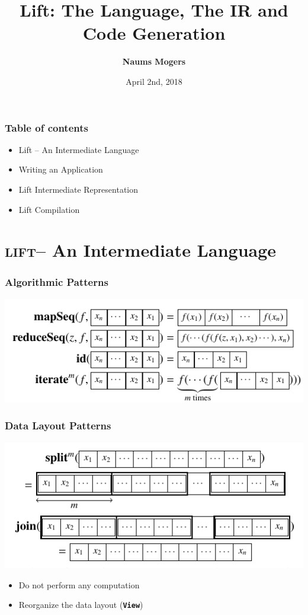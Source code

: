 \documentclass[10pt]{beamer}
\title{Lift: The Language, The IR and Code Generation}
\date{April 2nd, 2018}
\author{\textbf{Naums Mogers}}
\institute{University of Edinburgh}
\newcommand{\lift}{\textsc{lift}\space}
\newcommand{\code}[1]{\textbf{\texttt{#1}}}
\begin{document}
\begin{frame}
\maketitle
\end{frame}

\begin{frame}
\frametitle{Table of contents}
\begin{itemize}
	\item Lift -- An Intermediate Language
	\item Writing an Application
	\item Lift Intermediate Representation
	\item Lift Compilation
\end{itemize}
\end{frame}

\section{\lift -- An Intermediate Language}
\begin{frame}
\frametitle{Algorithmic Patterns}
    \begin{block}{}
        \begin{center}
            \includegraphics[width=.85\textwidth]{../images/algorithmic_patterns.pdf}
        \end{center}
    \end{block}
\end{frame}

\begin{frame}
\frametitle{Data Layout Patterns}
    \begin{block}{}
        \begin{center}
            \includegraphics[width=.85\textwidth]{../images/data_layout_patterns1.pdf}
        \end{center}
    \end{block}
\begin{itemize}
	\item Do not perform any computation
	\item Reorganize the data layout (\code{View})
\end{itemize}
\end{frame}
\end{document}

